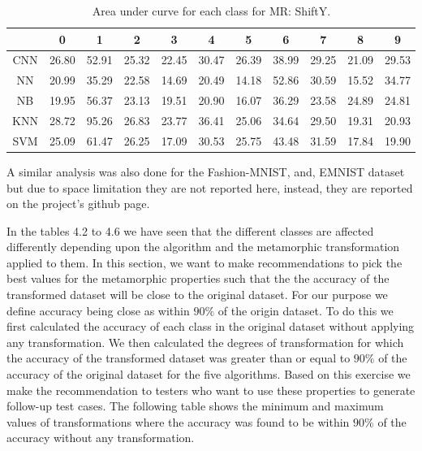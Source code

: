     \begin{table}[H]
    \centering
    \begin{tabular}{|c|c|c|c|c|c|c|c|c|c|c|}
    \hline
    & 0 & 1 & 2 & 3 & 4 & 5 & 6 & 7 & 8 & 9 \\
    \hline
    CNN & 26.80 & \cellcolor{green!25}52.91 & 25.32 & 22.45 & 30.47 & 26.39 & 38.99 & 29.25 & \cellcolor{red!25}21.09 & 29.53 \\ 
    \hline
    NN &  20.99 & 35.29 & 22.58 & 14.69 & 20.49 & \cellcolor{red!25}14.18 & \cellcolor{green!25}52.86 & 30.59 & 15.52 & 34.77 \\
    \hline
    NB & 19.95 & \cellcolor{green!25}56.37 & 23.13 & 19.51 & 20.90 & \cellcolor{red!25}16.07 & 36.29 & 23.58 & 24.89 & 24.81 \\
    \hline
    KNN & 28.72 & \cellcolor{green!25}95.26 & 26.83 & 23.77 & 36.41 & 25.06 & 34.64 & 29.50 & \cellcolor{red!25}19.31 & 20.93 \\
    \hline
    SVM & 25.09 & \cellcolor{green!25}61.47 & 26.25 & \cellcolor{red!25}17.09 & 30.53 & 25.75 & 43.48 & 31.59 & 17.84 & 19.90  \\
    \hline
    \end{tabular}
    \caption{Area under curve for each class for MR: ShiftY.}
    \label{tbl:test-file-formatShiftY}
    \end{table}
    
A similar analysis was also done for the Fashion-MNIST, and, EMNIST dataset but due to space limitation they are not reported here, instead, they are reported on the project's github page.

\clearpage
\newpage
In the tables 4.2 to 4.6 we have seen that the different classes are affected differently depending upon the algorithm and the metamorphic transformation applied to them. In this section, we want to make recommendations to pick the best values for the metamorphic properties such that the the accuracy of the transformed dataset will be close to the original dataset. For our purpose we define accuracy being close as within $90\%$ of the origin dataset. To do this we first calculated the accuracy of each class in the original dataset without applying any transformation. We then calculated the degrees of transformation for which the accuracy of the transformed dataset was greater than or equal to $90\%$ of the accuracy of the original dataset for the five algorithms. Based on this exercise we make the recommendation to testers who want to use these properties to generate follow-up test cases. The following table shows the minimum and maximum values of transformations where the accuracy was found to be within $90\%$ of the accuracy without any transformation.

